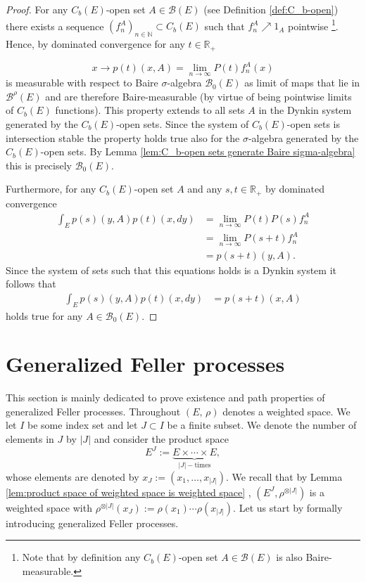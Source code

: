 \documentclass[a4paper,12pt]{article}
\theoremstyle{definition}
\theoremstyle{remark}
\numberwithin{equation}{section}
\numberwithin{theorem}{section}
\begin{document}
\begin{proof}
 For any $C_{b}(E)$-open set $A\in\mathcal{B}(E)$ (see Definition
\ref{def:C_b-open}) there exists a sequence $\left(f_{n}^{A}\right)_{n\in\mathbb{N}}\subset  C_{b}(E)$
such that $f_{n}^{A}\nearrow1_{A}$ pointwise \footnote{Note that by definition any $C_{b}(E)$-open set $A\in\mathcal{B}(E)$  is also Baire-measurable.}. Hence, by dominated convergence for any $t\in\mathbb{R}_{+}$

\[
x\rightarrow p(t)(x,A)=\underset{n\rightarrow\infty}{\lim}P(t)f_{n}^{A}(x)
\]
is measurable with respect to Baire $\sigma$-algebra $\mathcal{B}_{0}(E)$
as limit of maps that lie in $\mathcal{\mathscr{B}}^{\rho}(E)$ and are
therefore Baire-measurable (by virtue of being pointwise limits of
$C_{b}(E)$ functions). This property extends to all sets $A$ in
the Dynkin system generated by the $C_{b}(E)$-open sets. Since the
system of $C_{b}(E)$-open sets is intersection stable
the property holds true also for the $\sigma$-algebra generated by
the $C_{b}(E)$-open sets. By Lemma \ref{lem:C_b-open sets generate Baire sigma-algebra}
this is precisely $\mathcal{B}_{0}(E)$. 

Furthermore, for any $C_{b}(E)$-open set $A$ and any $s,t\in\mathbb{R}_{+}$
by dominated convergence
\begin{align*}
\int_{E}p(s)(y,A)p(t)(x,dy) & =\underset{n\rightarrow\infty}{\lim}P(t)P(s)f_{n}^{A}\\
 & =\underset{n\rightarrow\infty}{\lim}P(s+t)f_{n}^{A}\\
 & =p(s+t)(y,A).
\end{align*}
Since the system of sets such that this equations
holds is a Dynkin system it follows that 
\begin{align*}
\int_{E}p(s)(y,A)p(t)(x,dy) & =p(s+t)(x,A)
\end{align*}
holds true for any $A\in\mathcal{B}_0(E)$.
\end{proof}

 
\section{Generalized Feller processes}\label{sec:genfeller}

This section is mainly dedicated to prove existence and path properties of generalized Feller processes. Throughout $\left(E,\,\rho\right)$ denotes
a weighted space. We let $I$ be some index set and let $J\subset I$
be a finite subset.  We denote the number of elements in $J$ by $|J|$ and 
consider the product space
\[
E^{J}:=\underbrace{E \times \cdots \times E}_{|J|-\text{times}},
\]
whose elements are denoted by
$
x_{J}:=\left(x_{1},\ldots,x_{|J|}\right)
$.
We recall that by Lemma \ref{lem:product space of weighted space is weighted space}
,
$
\left(E^{J},\rho^{\otimes |J|}\right)
$
 is a weighted space with
$
\rho^{\otimes |J|}(x_{J}):=\rho\left(x_{{1}}\right)\cdots\rho\left(x_{|J|}\right).
$
Let us start by formally introducing generalized Feller processes.
\end{document}
